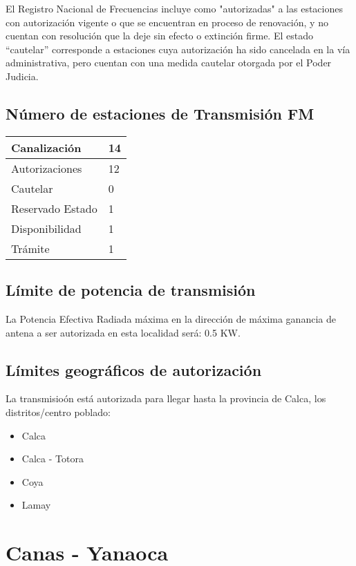 \documentclass[a4paper]{IEEEtran} %
\begin{document}
El Registro Nacional de Frecuencias incluye como "autorizadas" a las estaciones con autorización vigente o que se encuentran en proceso de renovación, y no cuentan con resolución que la deje sin efecto o extinción firme. El estado “cautelar” corresponde a estaciones cuya autorización ha sido cancelada en la vía administrativa, pero cuentan con una medida cautelar otorgada por el Poder Judicia.

\subsection{Número de estaciones de Transmisión FM}

\begin{tabular}{|l|l|} \hline
	Canalización 			& 14 \\ \hline
	Autorizaciones			& 12 \\ \hline
	Cautelar				& 0 \\ \hline
	Reservado Estado		& 1 \\ \hline
	Disponibilidad			& 1 \\ \hline
	Trámite					& 1 \\ \hline 
\end{tabular}

\subsection{Límite de potencia de transmisión}

La Potencia Efectiva Radiada máxima en la dirección de máxima ganancia de antena a ser autorizada en esta localidad será: 0.5 KW.

\subsection{Límites geográficos de autorización}

La transmisioón está autorizada para llegar hasta la provincia de Calca, los distritos/centro poblado:

\begin{itemize}
	\item Calca
	\item Calca - Totora
	\item Coya
	\item Lamay
\end{itemize}


\section{Canas - Yanaoca}
\end{document}
